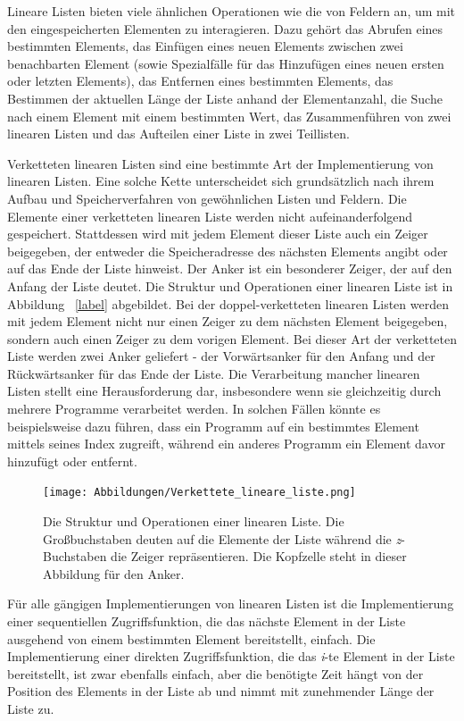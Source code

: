 Lineare Listen bieten viele ähnlichen Operationen wie die von Feldern an, um mit den eingespeicherten Elementen zu interagieren. Dazu gehört das Abrufen eines bestimmten Elements, das Einfügen eines neuen Elements zwischen zwei benachbarten Element (sowie Spezialfälle für das Hinzufügen eines neuen ersten oder letzten Elements), das Entfernen eines bestimmten Elements, das Bestimmen der aktuellen Länge der Liste anhand der Elementanzahl, die Suche nach einem Element mit einem bestimmten Wert, das Zusammenführen von zwei linearen Listen und das Aufteilen einer Liste in zwei Teillisten.\autocite[42-43]{ollmert_datenstrukturen_2020}


Verketteten linearen Listen sind eine bestimmte Art der Implementierung von linearen Listen. Eine solche Kette unterscheidet sich grundsätzlich nach ihrem Aufbau und Speicherverfahren von gewöhnlichen Listen und Feldern. Die Elemente einer verketteten linearen Liste werden nicht aufeinanderfolgend gespeichert. Stattdessen wird mit jedem Element dieser Liste auch ein Zeiger beigegeben, der entweder die Speicheradresse des nächsten Elements angibt oder auf das Ende der Liste hinweist. Der Anker ist ein besonderer Zeiger, der auf den Anfang der Liste deutet. Die Struktur und Operationen einer linearen Liste ist in Abbildung ~\ref{label} abgebildet. Bei der doppel-verketteten linearen Listen werden mit jedem Element nicht nur einen Zeiger zu dem nächsten Element beigegeben, sondern auch einen Zeiger zu dem vorigen Element. Bei dieser Art der verketteten Liste werden zwei Anker geliefert - der Vorwärtsanker für den Anfang und der Rückwärtsanker für das Ende der Liste. Die Verarbeitung mancher linearen Listen stellt eine Herausforderung dar, insbesondere wenn sie gleichzeitig durch mehrere Programme verarbeitet werden. In solchen Fällen könnte es beispielsweise dazu führen, dass ein Programm auf ein bestimmtes Element mittels seines Index zugreift, während ein anderes Programm ein Element davor hinzufügt oder entfernt. \autocite[43-44]{ollmert_datenstrukturen_2020}

\begin{figure}[t]
	\texttt{[image: Abbildungen/Verkettete\_lineare\_liste.png]}
	\centering
	\caption{Die Struktur und Operationen einer linearen Liste. Die Großbuchstaben deuten auf die Elemente der Liste während die \textit{z}-Buchstaben die Zeiger repräsentieren. Die Kopfzelle steht in dieser Abbildung für den Anker.\autocite[611]{ernst_grundkurs_2020}}
\end{figure}

Für alle gängigen Implementierungen von linearen Listen ist die Implementierung einer sequentiellen Zugriffsfunktion, die das nächste Element in der Liste ausgehend von einem bestimmten Element bereitstellt, einfach. Die Implementierung einer direkten Zugriffsfunktion, die das \textit{i}-te Element in der Liste bereitstellt, ist zwar ebenfalls einfach, aber die benötigte Zeit hängt von der Position des Elements in der Liste ab und nimmt mit zunehmender Länge der Liste zu.\autocite[45]{ollmert_datenstrukturen_2020}


